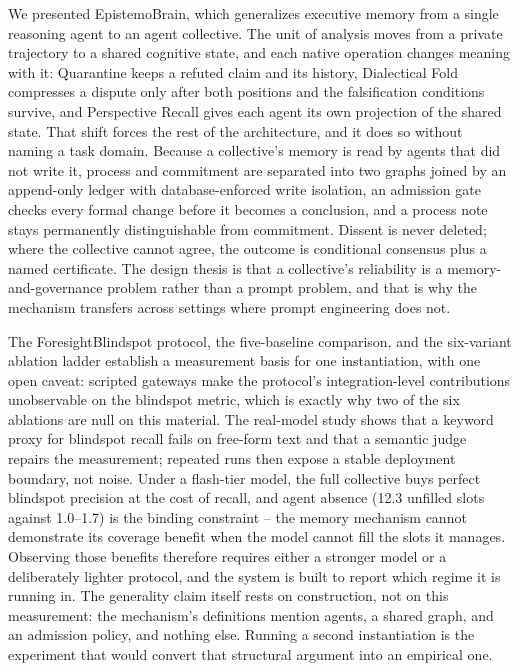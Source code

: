 We presented EpistemoBrain, which generalizes executive memory from a single
reasoning agent to an agent collective. The unit of analysis moves from a
private trajectory to a shared cognitive state, and each native operation
changes meaning with it: Quarantine keeps a refuted claim and its history,
Dialectical Fold compresses a dispute only after both positions and the
falsification conditions survive, and Perspective Recall gives each agent its
own projection of the shared state. That shift forces the rest of the
architecture, and it does so without naming a task domain. Because a
collective's memory is read by agents that did not write it, process and
commitment are separated into two graphs joined by an append-only ledger with
database-enforced write isolation, an admission gate checks every formal
change before it becomes a conclusion, and a process note stays permanently
distinguishable from commitment. Dissent is never deleted; where the
collective cannot agree, the outcome is conditional consensus plus a named
certificate. The design thesis is that a collective's reliability is a
memory-and-governance problem rather than a prompt problem, and that is why
the mechanism transfers across settings where prompt engineering does not.

The ForesightBlindspot protocol, the five-baseline comparison, and the
six-variant ablation ladder establish a measurement basis for one
instantiation, with one open caveat: scripted gateways make the protocol's
integration-level contributions unobservable on the blindspot metric, which is
exactly why two of the six ablations are null on this material. The real-model
study shows that a keyword proxy for blindspot recall fails on free-form text
and that a semantic judge repairs the measurement; repeated runs then expose a
stable deployment boundary, not noise. Under a flash-tier model, the
full collective buys perfect blindspot precision at the cost of recall, and
agent absence (12.3 unfilled slots against 1.0--1.7) is the binding constraint
-- the memory mechanism cannot demonstrate its coverage benefit when the model
cannot fill the slots it manages. Observing those benefits therefore requires
either a stronger model or a deliberately lighter protocol, and the system is
built to report which regime it is running in. The generality claim itself
rests on construction, not on this measurement: the mechanism's
definitions mention agents, a shared graph, and an admission policy, and
nothing else. Running a second instantiation is the experiment that would
convert that structural argument into an empirical one.

